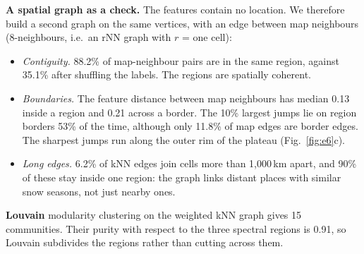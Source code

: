 \documentclass[11pt]{article}
\begin{document}
\begin{table}[h]
\centering\small
{}
\caption{The three regions. $^*$Median dates on which a cell's mean depth first rises
above, and last falls below, 30\% of its maximum.}
\label{tab:regions}
\end{table}

\textbf{A spatial graph as a check.} The features contain no location. We therefore build
a second graph on the same vertices, with an edge between map neighbours (8-neighbours,
i.e.\ an rNN graph with $r$ = one cell):
\begin{itemize}\setlength\itemsep{0.1em}
  \item \emph{Contiguity.} 88.2\% of map-neighbour pairs are in the same region, against
        35.1\% after shuffling the labels. The regions are spatially coherent.
  \item \emph{Boundaries.} The feature distance between map neighbours has median 0.13
        inside a region and 0.21 across a border. The 10\% largest jumps lie on region
        borders 53\% of the time, although only 11.8\% of map edges are border edges. The
        sharpest jumps run along the outer rim of the plateau (Fig.~\ref{fig:e6}c).
  \item \emph{Long edges.} 6.2\% of kNN edges join cells more than 1,000\,km apart, and
        90\% of these stay inside one region: the graph links distant places with similar
        snow seasons, not just nearby ones.
\end{itemize}

\textbf{Louvain} modularity clustering \cite{blondel2008} on the weighted kNN graph gives
15 communities. Their purity with respect to the three spectral regions is 0.91, so
Louvain subdivides the regions rather than cutting across them.
\end{document}
